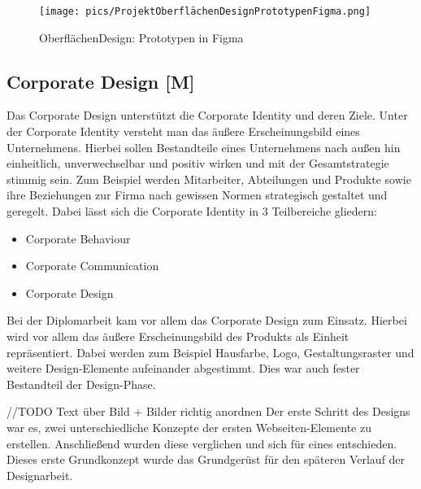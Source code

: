 \begin{figure}
    \centering
    \texttt{[image: pics/ProjektOberflächenDesignPrototypenFigma.png]}
    \caption{OberflächenDesign: Prototypen in Figma}
    \label{fig:impl:design:prototypesfigma}
\end{figure}

\subsection{Corporate Design [M]}
Das Corporate Design unterstützt die Corporate Identity und deren Ziele. Unter der Corporate Identity versteht man das äußere Erscheinungsbild eines Unternehmens. Hierbei sollen Bestandteile eines Unternehmens nach außen hin einheitlich, unverwechselbar und positiv wirken und mit der Gesamtstrategie stimmig sein. Zum Beispiel werden Mitarbeiter, Abteilungen und Produkte sowie ihre Beziehungen zur Firma nach gewissen Normen strategisch gestaltet und geregelt. Dabei lässt sich die Corporate Identity in 3 Teilbereiche gliedern:

\begin{itemize}
    \item Corporate Behaviour
    \item Corporate Communication
    \item Corporate Design
\end{itemize}
\cite{CorporateIdentity}

Bei der Diplomarbeit kam vor allem das Corporate Design zum Einsatz. Hierbei wird vor allem das äußere Erscheinungsbild des Produkts als Einheit repräsentiert. Dabei werden zum Beispiel Hausfarbe, Logo, Gestaltungsraster und weitere Design-Elemente aufeinander abgestimmt. Dies war auch fester Bestandteil der Design-Phase.
\cite{CorporateDesign}

//TODO Text über Bild + Bilder richtig anordnen
Der erste Schritt des Designs war es, zwei unterschiedliche Konzepte der ersten Webseiten-Elemente zu erstellen. Anschließend wurden diese verglichen und sich für eines entschieden. Dieses erste Grundkonzept wurde das Grundgerüst für den späteren Verlauf der Designarbeit.

